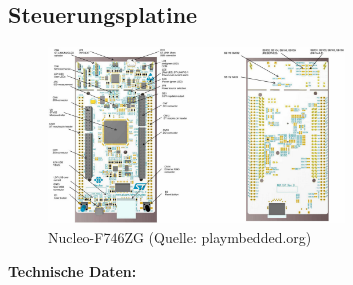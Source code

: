 \subsection{Steuerungsplatine}


\begin{figure}[!h]  %

	\centering\includegraphics[width=0.7\textwidth]{images/nucleo.jpg}
	\caption{Nucleo-F746ZG  \newline (Quelle: playmbedded.org)}
	\label{Nucleo}
	
\end{figure}


\textbf{Technische Daten:} 

